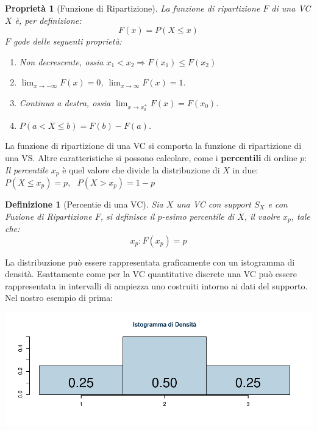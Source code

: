 \documentclass[
  11pt,
]{book}
\providecommand{\tightlist}{%
  \setlength{\itemsep}{0pt}\setlength{\parskip}{0pt}}
\theoremstyle{mytheoremstyle}
\newtheorem{proposition}{Proprietà}[section]
\theoremstyle{mydefstyle}
\newtheorem{definition}{Definizione}[section]
\begin{document}
\begin{info}

\begin{proposition}[Funzione di Ripartizione]

La funzione di ripartizione \(F\) di una VC \(X\) è, per definizione:
\[F(x)=P(X\leq x)\]
\(F\) gode delle seguenti proprietà:

\begin{enumerate}
\def\labelenumi{\arabic{enumi}.}
\tightlist
\item
  Non decrescente, ossia \(x_{1}<x_{2} \Rightarrow F(x_{1}) \le F(x_{2})\)
\item
  \(\lim_{x\to -\infty} F(x) = 0\), \qquad \(\lim_{x\to\infty} F(x) = 1\).
\item
  Continua a destra, ossia \(\lim_{x\to x_{0}^{+}} F(x) = F(x_{0})\).
\item
  \(P(a < X \le b) = F(b) - F(a)\).
\end{enumerate}

\end{proposition}

\end{info}

La funzione di ripartizione di una VC si comporta la funzione di ripartizione di
una VS.
Altre caratteristiche si possono calcolare, come i \textbf{percentili} di ordine \(p\):
\emph{Il percentile} \(x_p\) è quel valore che divide la distribuzione di \(X\) in due:
\(P(X\le x_p)=p,~~~P(X>x_p)=1-p\)

\begin{info}

\begin{definition}[Percentie di una VC]
Sia \(X\) una VC con support \(S_X\) e con Fuzione di Ripartizione \(F\), si definisce il \(p\)-esimo percentile di \(X\), il vaolre \(x_p\), tale che:
\[
x_p:F(x_p)=p
\]
\end{definition}

\end{info}

La distribuzione può essere rappresentata graficamente con un istogramma di densità.
Esattamente come per la VC quantitative discrete una VC può essere rappresentata
in intervalli di ampiezza uno costruiti intorno ai dati del supporto.
Nel nostro esempio di prima:

\begin{center}\includegraphics{Appunti_di_Statistica_2025_files/figure-latex/06-Variabili-Casuali-1,-1} \end{center}
\end{document}
